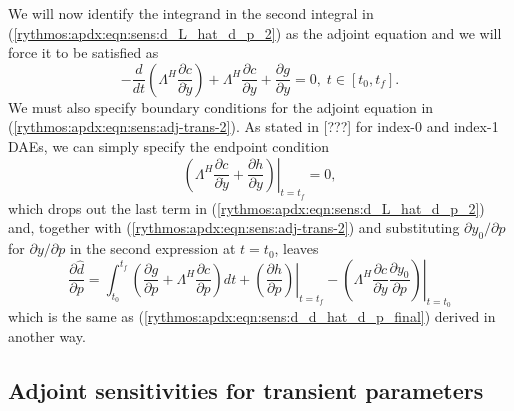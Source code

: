 \documentclass[pdf,ps2pdf,11pt]{SANDreport}
\begin{document}
%
We will now identify the integrand in the second integral in
(\ref{rythmos:apdx:eqn:sens:d_L_hat_d_p_2}) as the adjoint equation and we
will force it to be satisfied as
%
\begin{equation}
- \frac{d}{dt}\left( \Lambda^H \frac{\partial c}{\partial \dot{y}} \right)
+  \Lambda^H \frac{\partial c}{\partial y} +  \frac{\partial g}{\partial y} = 0, \; t \in \left[ t_0, t_f \right].
\label{rythmos:apdx:eqn:sens:adj-trans-2}
\end{equation}
%
We must also specify boundary conditions for the adjoint equation in
(\ref{rythmos:apdx:eqn:sens:adj-trans-2}).  As stated in [???] for index-0 and
index-1 DAEs, we can simply specify the endpoint condition
%
\begin{equation}
\left. \left(
  \Lambda^H \frac{\partial c}{\partial \dot{y}}
  +  \frac{\partial h}{\partial y}
\right) \right|_{t=t_f}
 = 0,
\label{rythmos:apdx:eqn:sens:adj-trans:fc-2}
\end{equation}
%
which drops out the last term in (\ref{rythmos:apdx:eqn:sens:d_L_hat_d_p_2})
and, together with (\ref{rythmos:apdx:eqn:sens:adj-trans-2}) and substituting
$\partial y_0 / {}\partial p$ for $\partial y / {}\partial p$ in the second
expression at $t=t_0$, leaves
%
\begin{equation}
\frac{\partial \hat{d}}{\partial p} =
\int_{t_0}^{t_f} \left(
    \frac{\partial g}{\partial p}
    + \Lambda^H \frac{\partial c}{\partial p}
  \right) dt
  + \left. \left( \frac{\partial h}{\partial p} \right) \right|_{t=t_f}
  - \left. \left( \Lambda^H \frac{\partial c}{\partial \dot{y}} \frac{\partial y_0}{\partial p} \right) \right|_{t=t_0}
\label{rythmos:apdx:eqn:sens:d_d_hat_d_p_final-2}
\end{equation}
%
which is the same as (\ref{rythmos:apdx:eqn:sens:d_d_hat_d_p_final}) derived
in another way.

\subsection{Adjoint sensitivities for transient parameters}
\end{document}
